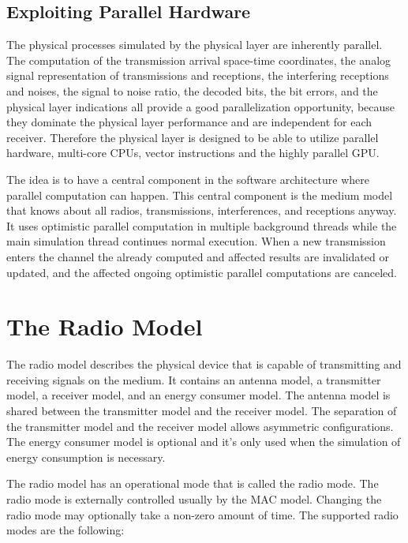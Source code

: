 \subsection{Exploiting Parallel Hardware}

The physical processes simulated by the physical layer are inherently parallel.
The computation of the transmission arrival space-time coordinates, the analog
signal representation of transmissions and receptions, the interfering
receptions and noises, the signal to noise ratio, the decoded bits, the bit
errors, and the physical layer indications all provide a good parallelization
opportunity, because they dominate the physical layer performance and are
independent for each receiver. Therefore the physical layer is designed to be
able to utilize parallel hardware, multi-core CPUs, vector instructions and the
highly parallel GPU.

The idea is to have a central component in the software architecture where
parallel computation can happen. This central component is the medium model
that knows about all radios, transmissions, interferences, and receptions
anyway. It uses optimistic parallel computation in multiple background threads
while the main simulation thread continues normal execution. When a new
transmission enters the channel the already computed and affected results are
invalidated or updated, and the affected ongoing optimistic parallel
computations are canceled.

\section{The Radio Model}

The radio model describes the physical device that is capable of transmitting
and receiving signals on the medium. It contains an antenna model, a transmitter
model, a receiver model, and an energy consumer model. The antenna model is
shared between the transmitter model and the receiver model. The separation of
the transmitter model and the receiver model allows asymmetric configurations.
The energy consumer model is optional and it's only used when the simulation of
energy consumption is necessary.

The radio model has an operational mode that is called the radio mode. The radio
mode is externally controlled usually by the MAC model. Changing the radio mode
may optionally take a non-zero amount of time. The supported radio modes are the
following:

